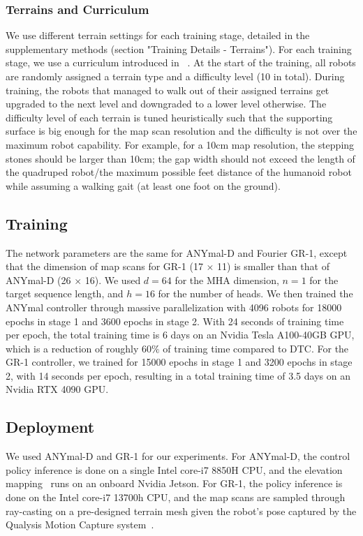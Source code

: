 \documentclass[9pt,twocolumn,twoside]{osajnl}
\begin{document}
\subsubsection*{Terrains and Curriculum}
We use different terrain settings for each training stage, detailed in the supplementary methods (section "Training Details - Terrains"). For each training stage, we use a curriculum introduced in ~\cite{Rudin2021}. At the start of the training, all robots are randomly assigned a terrain type and a difficulty level (10 in total). During training, the robots that managed to walk out of their assigned terrains get upgraded to the next level and downgraded to a lower level otherwise. The difficulty level of each terrain is tuned heuristically such that the supporting surface is big enough for the map scan resolution and the difficulty is not over the maximum robot capability. For example, for a 10cm map resolution, the stepping stones should be larger than 10cm; the gap width should not exceed the length of the quadruped robot/the maximum possible feet distance of the humanoid robot while assuming a walking gait (at least one foot on the ground).  

\subsection*{Training}
The network parameters are the same for ANYmal-D and Fourier GR-1, except that the dimension of map scans for GR-1 (17 $\times$ 11) is smaller than that of ANYmal-D (26 $\times$ 16). We used $d=64$ for the MHA dimension, $n=1$ for the target sequence length, and $h = 16$ for the number of heads. We then trained the ANYmal controller through massive parallelization with 4096 robots for 18000 epochs in stage 1 and 3600 epochs in stage 2. With 24 seconds of training time per epoch, the total training time is 6 days on an Nvidia Tesla A100-40GB GPU, which is a reduction of roughly $60\%$ of training time compared to DTC. For the GR-1 controller, we trained for 15000 epochs in stage 1 and 3200 epochs in stage 2, with 14 seconds per epoch, resulting in a total training time of 3.5 days on an Nvidia RTX 4090 GPU.

\subsection*{Deployment}
We used ANYmal-D and GR-1 for our experiments. For ANYmal-D, the control policy inference is done on a single Intel core-i7 8850H CPU, and the elevation mapping~\cite{elevationmapping_cupy} runs on an onboard Nvidia Jetson. For GR-1, the policy inference is done on the Intel core-i7 13700h CPU, and the map scans are sampled through ray-casting on a pre-designed terrain mesh given the robot's pose captured by the Qualysis Motion Capture system~\cite{qtm}.
\end{document}
